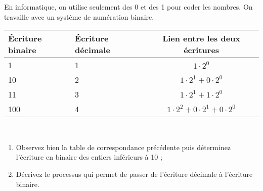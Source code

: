 \begin{TP}


En informatique, on utilise seulement des 0 et des 1 pour coder les nombres. On travaille avec un système de numération binaire.

\begin{center}
\begin{tabularx}{0.7\linewidth}{|X|X|c|}
\hline
Écriture binaire & Écriture décimale & Lien entre les deux écritures \\ \hline
1 & 1 & $1\cdot 2^0$ \\ \hline
10 & 2 & $1\cdot2^1+0\cdot 2^0$ \\ \hline
11 & 3 & $1\cdot2^1+1\cdot 2^0$ \\ \hline
100 & 4 & $1\cdot2^2+0\cdot 2^1+0\cdot 2^0$ \\ \hline
\end{tabularx} \\
\end{center}

\begin{enumerate}
 \item Observez bien la table de correspondance précédente puis déterminez l'écriture en binaire des entiers inférieurs à 10 ; \label{NbsEntMultDivis_engroupe}
 \vspace{1em}
 \item Décrivez le processus qui permet de passer de l'écriture décimale à l'écriture binaire.
 

\end{enumerate}
\end{TP}
